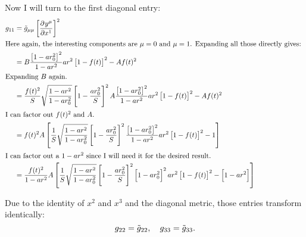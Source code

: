 Now I will turn to the first diagonal entry:
\begin{align*}
    g_{11}
    &= \tilde g_{\mu\mu} \sbr{\dpd{{y^\mu}}{{x^1}}}^2 \\
    \intertext{%
        Here again, the interesting components are $\mu = 0$ and $\mu = 1$.
        Expanding all those directly gives:
    }
    &= B \frac{\sbr{1 - ar_0^2}^2}{1 - ar^2} ar^2 \sbr{1 - f(t)}^2 - A f(t)^2
    \\
    \intertext{%
        Expanding $B$ again.
    }
    &= \frac{f(t)^2}S \WW \sbr{1 - \frac{ar_0^2}S}^2 A \frac{\sbr{1 -
    ar_0^2}^2}{1 - ar^2} ar^2 \sbr{1 - f(t)}^2 - A f(t)^2 \\
    \intertext{%
        I can factor out $f(t)^2$ and $A$.
    }
    &= f(t)^2 A \sbr{ \frac{1}S \WW \sbr{1 - \frac{ar_0^2}S}^2 \frac{\sbr{1 -
    ar_0^2}^2}{1 - ar^2} ar^2 \sbr{1 - f(t)}^2 - 1} \\
    \intertext{%
        I can factor out a $1 - ar^2$ since I will need it for the desired
        result.
    }
    &= \frac{f(t)^2}{1 - ar^2} A \sbr{ \frac{1}S \WW \sbr{1 - \frac{ar_0^2}S}^2
\sbr{1 - ar_0^2}^2 ar^2 \sbr{1 - f(t)}^2 - \sbr{1 - ar^2}} \\
\end{align*}

Due to the identity of $x^2$ and $x^3$ and the diagonal metric, those entries
transform identically:
\[
    g_{22} = \tilde g_{22}
    ,\quad
    g_{33} = \tilde g_{33}.
\]


\IfFileExists{\bibliographyfile}{
    \printbibliography
}{}



